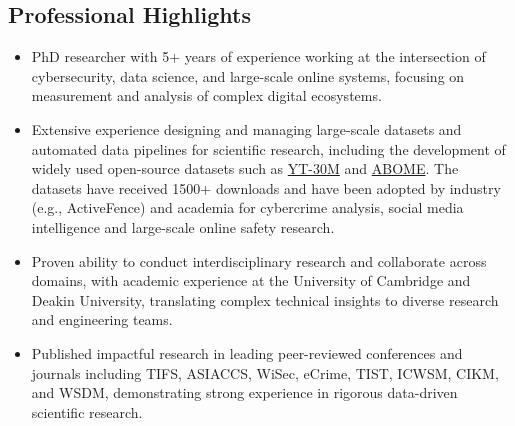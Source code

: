 \documentclass[margin, centered]{res}
\begin{document}
\begin{resume}
\section{Professional Highlights}
\begin{itemize}[leftmargin=*]

\item PhD researcher with 5+ years of experience working at the intersection of cybersecurity, data science, and large-scale online systems, focusing on measurement and analysis of complex digital ecosystems.

\item Extensive experience designing and managing large-scale datasets and automated data pipelines for scientific research, including the development of widely used open-source datasets such as \href{https://huggingface.co/datasets/hridaydutta123/YT-100K}{YT-30M} and \href{https://zenodo.org/records/4437987}{ABOME}. The datasets have received 1500+ downloads and have been adopted by industry (e.g., ActiveFence) and academia for cybercrime analysis,  social media intelligence and large-scale online safety research.

\item Proven ability to conduct interdisciplinary research and collaborate across domains, with academic experience at the University of Cambridge and Deakin University, translating complex technical insights to diverse research and engineering teams.

\item Published impactful research in leading peer-reviewed conferences and journals including TIFS, ASIACCS, WiSec, eCrime, TIST, ICWSM, CIKM, and WSDM, demonstrating strong experience in rigorous data-driven scientific research.

\end{itemize}

\end{resume}
\end{document}
